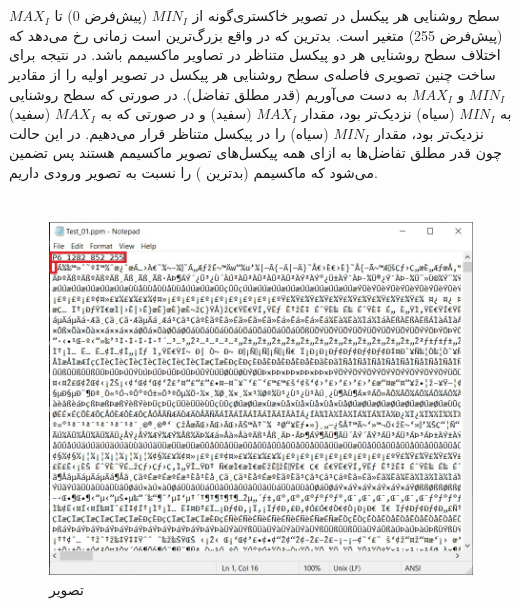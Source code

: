 \documentclass{article}
\begin{document}
\section{}%
سطح روشنایی هر پیکسل در تصویر خاکستری‌گونه از $MIN_{I}$ (پیش‌فرض 0) تا $MAX_{I}$ (پیش‌فرض 255) متغیر است. بدترین  که در واقع بزرگ‌ترین  است زمانی رخ می‌دهد که اختلاف سطح روشنایی هر دو پیکسل متناظر در تصاویر ماکسیمم باشد. در نتیجه برای ساخت چنین تصویری فاصله‌ی سطح روشنایی هر پیکسل در تصویر اولیه را از مقادیر $MIN_{I}$ و $MAX_{I}$ به دست می‌آوریم (قدر مطلق تفاضل). در صورتی که سطح روشنایی به $MIN_{I}$ (سیاه) نزدیک‌تر بود، مقدار $MAX_{I}$ (سفید) و در صورتی که به $MAX_{I}$ (سفید) نزدیک‌تر بود، مقدار $MIN_{I}$ (سیاه) را در پیکسل متناظر قرار می‌دهیم. در این حالت چون قدر مطلق تفاضل‌ها به ازای همه پیکسل‌های تصویر ماکسیمم هستند پس تضمین می‌شود که ماکسیمم (بدترین ) را نسبت به تصویر ورودی داریم.





\section{}%
\subsection{}

\begin{figure}[H]
    \centering
    \includegraphics[width=1\textwidth]{figures/1a.jpg}
    \caption
	{
تصویر
	}
    \label{fig:fig1}
\end{figure}
\end{document}
